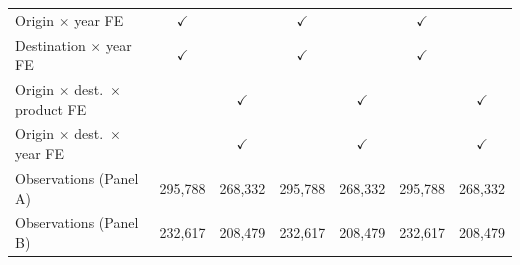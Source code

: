 \begin{tabular}{lcccccc}
Origin $\times$ year FE & $\checkmark$ &  & $\checkmark$ &  & $\checkmark$ &  \\
Destination $\times$ year FE & $\checkmark$ &  & $\checkmark$ &  & $\checkmark$ &  \\
Origin $\times$ dest.\ $\times$ product FE &  & $\checkmark$ &  & $\checkmark$ &  & $\checkmark$ \\
Origin $\times$ dest.\ $\times$ year FE &  & $\checkmark$ &  & $\checkmark$ &  & $\checkmark$ \\
Observations (Panel A) & 295,788 & 268,332 & 295,788 & 268,332 & 295,788 & 268,332 \\
Observations (Panel B) & 232,617 & 208,479 & 232,617 & 208,479 & 232,617 & 208,479 \\
\hline
\end{tabular}

